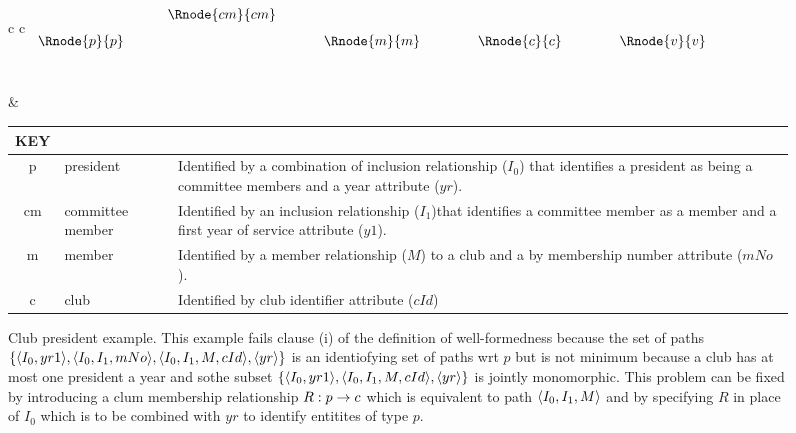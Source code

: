 \begin{figure} [h]
\begin{center}
\begin{tabular}{c c}
$
\begin{array}{cp{0.4cm}cp{0.5cm}cp{0.75cm}cp{0.75cm}c}
              &&                &&               &&                &&               \\[0.25cm]
              && \Rnode{cm}{cm} &&               &&                &&               \\[0.25cm]
\Rnode{p}{p}	&&                && \Rnode{m}{m}  &&   \Rnode{c}{c} && \Rnode{v}{v}  \\[0.25cm]
	            &&  
\end{array}
$

\idcomp
{}
\idcomp
{}
\idcomp
{}
\idcomp
{}
\idcomp
{}
\idcomp
{}
\idcomp
& \footnotesize
\begin{tabular}{c p{1.5cm} p{4cm}}
KEY && \\
\hline
p  & president        & Identified by a combination of inclusion relationship ($I_0$) that identifies a
                       president as being a committee members and a year attribute ($yr$). \\
cm & committee member & Identified by an inclusion relationship ($I_1$)that identifies a committee member 
                         as a member and a first year of service attribute ($y1$).\\
m  & member           & Identified by a member relationship ($M$) to a club and a by membership 
                         number attribute ($mNo$). \\
c  & club             & Identified by club identifier attribute ($cId$)
\end{tabular} 
\end{tabular}
\end{center}
\caption{Club president example. 
This example fails clause (i) of the definition of well-formedness because
the set of paths $\left\{\langle I_0,yr1\rangle,\langle I_0,I_1,mNo\rangle, \langle I_0,I_1,M,cId\rangle, \langle yr\rangle\right\}$ is 
an identiofying set of paths wrt $p$ but is not minimum because a club has at most one president a year and sothe subset $\left\{\langle I_0,yr1\rangle, \langle I_0,I_1,M,cId\rangle, \langle yr\rangle\right\}$ is jointly monomorphic. 
This problem can be fixed by introducing a clum membership relationship $R: p \rightarrow c$ which is equivalent to
path $\langle I_0,I_1,M\rangle$ and by specifying $R$ in place of $I_0$ which is to be combined with $yr$ to identify entitites of type $p$.
}
\label{clubpresidentbeforenormalisation}
\end{figure}

